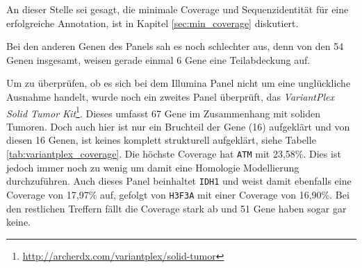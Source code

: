 An dieser Stelle sei gesagt, die minimale Coverage und Sequenzidentität für eine erfolgreiche Annotation, ist in Kapitel \ref{sec:min_coverage} diskutiert. 

Bei den anderen Genen des Panels sah es noch schlechter aus, denn von den 54 Genen insgesamt, weisen gerade einmal 6 Gene eine Teilabdeckung auf.

\begin{table}[]
    \centering
    \caption{VariantPlex Solid Tumor Kit, es sind die Gennamen, Genlänge in Basenpaaren (bp), Transkriptlänge ist mit UTRs und CDS, PDB Template IDs und PDB Coverage angegeben.}
    \label{tab:variantplex_coverage}
\end{table}

Um zu überprüfen, ob es sich bei dem Illumina Panel nicht um eine unglückliche Ausnahme handelt, wurde noch ein zweites Panel überprüft, das \emph{VariantPlex Solid Tumor Kit}\footnote{\url{http://archerdx.com/variantplex/solid-tumor}}. Dieses umfasst 67 Gene im Zusammenhang mit soliden Tumoren. Doch auch hier ist nur ein Bruchteil der Gene (16) aufgeklärt und von diesen 16 Genen, ist keines komplett strukturell aufgeklärt, siehe Tabelle \ref{tab:variantplex_coverage}. Die höchste Coverage hat \texttt{ATM} mit 23,58\%. Dies ist jedoch immer noch zu wenig um damit eine Homologie Modellierung durchzuführen. Auch dieses Panel beinhaltet \texttt{IDH1} und weist damit ebenfalls eine Coverage von 17,97\% auf, gefolgt von \texttt{H3F3A} mit einer Coverage von 16,90\%. Bei den restlichen Treffern fällt die Coverage stark ab und 51 Gene haben sogar gar keine.

